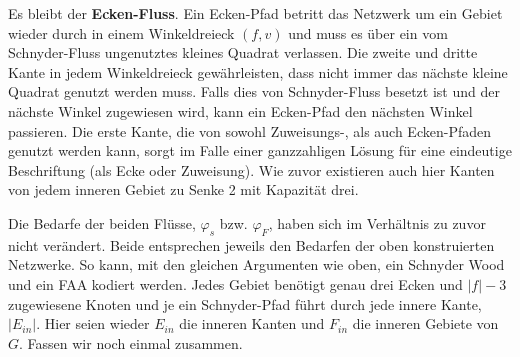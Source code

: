 Es bleibt der \textbf{Ecken-Fluss}. Ein Ecken-Pfad betritt das Netzwerk um ein Gebiet wieder durch in einem Winkeldreieck $(f,v)$ und muss es über ein vom Schnyder-Fluss ungenutztes kleines Quadrat verlassen. Die zweite und dritte Kante in jedem Winkeldreieck gewährleisten, dass nicht immer das nächste kleine Quadrat genutzt werden muss. Falls dies von Schnyder-Fluss besetzt ist und der nächste Winkel zugewiesen wird, kann ein Ecken-Pfad den nächsten Winkel passieren. Die erste Kante, die von sowohl Zuweisungs-, als auch Ecken-Pfaden genutzt werden kann, sorgt im Falle einer ganzzahligen Lösung für eine eindeutige Beschriftung (als Ecke oder Zuweisung). Wie zuvor existieren auch hier Kanten von jedem inneren Gebiet zu Senke 2 mit Kapazität drei.

Die Bedarfe der beiden Flüsse, $\varphi_s$ bzw. $\varphi_F$, haben sich im Verhältnis zu zuvor nicht verändert. Beide entsprechen jeweils den Bedarfen der oben konstruierten Netzwerke. So kann, mit den gleichen Argumenten wie oben, ein Schnyder Wood und ein FAA kodiert werden. Jedes Gebiet benötigt genau drei Ecken und $|f|-3$ zugewiesene Knoten und je ein Schnyder-Pfad führt durch jede innere Kante, $|E_{in}|$. Hier seien wieder $E_{in}$ die inneren Kanten und $F_{in}$ die inneren Gebiete von $G$. Fassen wir noch einmal zusammen.

